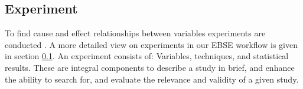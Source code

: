 \subsection{Experiment}
\label{subsec:experiment}

To find cause and effect relationships between variables experiments are conducted \cite{BuddiesVariables}. A more detailed view on experiments in our EBSE workflow  is given in section \ref{subsec:experiment}. An experiment consists of: Variables, techniques, and statistical results. These are integral components to describe a study in brief, and enhance the ability to search for, and evaluate the relevance and validity of a given study.